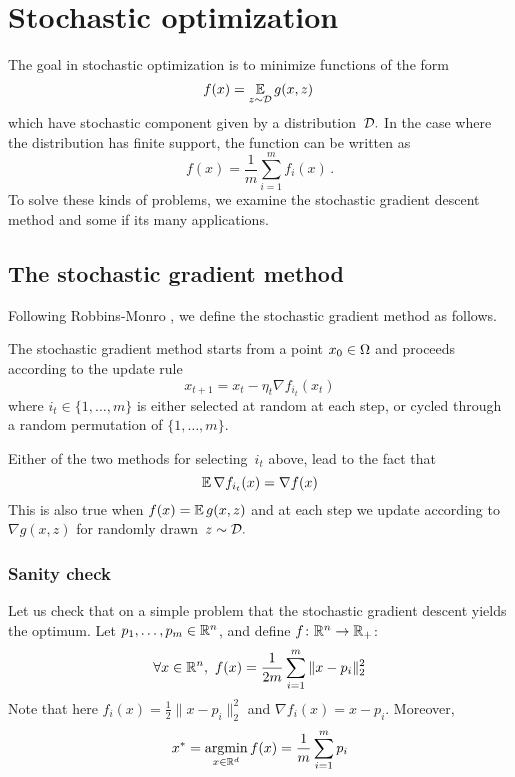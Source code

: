 \section{Stochastic optimization}
The goal in stochastic optimization is to 
minimize functions of the form
\[
    f(x) = \operatorname*{\mathbb{E}}_{z\sim {\cal D}}g(x,z)\,
\]
which have stochastic component given by a distribution~${\cal D}.$ In the case where
the distribution has finite support, the function can be written as
\[
    f(x) = \frac{1}{m}\sum_{i=1}^m f_i(x)\,.
\]
To solve these kinds of problems, we examine the stochastic gradient descent
method and some if its many applications.

\subsection{The stochastic gradient method}

Following Robbins-Monro \cite{Robbins&Monro:1951}, we define the stochastic
gradient method as follows. 

\begin{definition}
The stochastic gradient method starts from a point $x_0\in\Omega$ and proceeds
according to the update rule
\begin{equation*}
    x_{t+1} = x_t - \eta_t\nabla f_{i_t}(x_t) 
\end{equation*}
where $i_t\in\{1,\dots,m\}$ is either selected at random at each step, or cycled
through a random permutation of $\{1,\dots,m\}$.
\end{definition}

Either of the two methods for selecting~$i_t$ above, lead to the fact that
\[
    \operatorname*{\mathbb{E}}\nabla f_{i_t}(x) = \nabla f(x)
\]
This is also true when $f(x)=\operatorname*{\mathbb{E}} g(x,z)$ and at each step we update according to
$\nabla g(x,z)$ for randomly drawn~$z\sim{\cal D}.$
%
\subsubsection{Sanity check}

Let us check that on a simple problem that the stochastic gradient descent yields the optimum. Let $p_1, \dots, p_m\in \mathbb{R}^n$, and define $f\colon \mathbb{R}^n \rightarrow \mathbb{R}_+$:
\begin{equation*}
    \forall x\in \mathbb{R}^n,\ f(x) = \frac{1}{2m}\sum_{i=1}^m \|x-p_i\|_2^2
\end{equation*}
Note that 
here $f_i(x) = \frac{1}{2}\|x-p_i\|_2^2$ 
and $\nabla f_i(x) = x-p_i.$ 
Moreover,
\begin{equation*}
    x^* = \mathop{\rm argmin}_{x\in\mathbb{R}^d} f(x) = \frac{1}{m}\sum_{i=1}^mp_i
\end{equation*}


